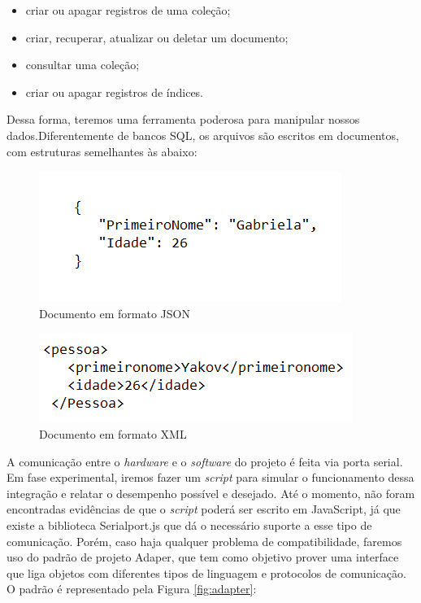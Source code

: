 \begin{itemize}
    \item criar ou apagar registros de uma coleção;
    \item criar, recuperar, atualizar ou deletar um documento;
    \item consultar uma coleção;
    \item criar ou apagar registros de índices. 
\end{itemize}

Dessa forma, teremos uma ferramenta poderosa para manipular nossos dados.Diferentemente de bancos SQL, os arquivos são escritos em documentos, com estruturas semelhantes às abaixo:

\begin{figure}[!h]
	\centering
	\label{json}
		\includegraphics[keepaspectratio=true,scale=0.9]{figuras/json.png}
	\caption{Documento em formato JSON}
	\label{fig:json}
\end{figure}

\begin{figure}[!h]
	\centering
	\label{xml}
		\includegraphics[keepaspectratio=true,scale=0.9]{figuras/xml.png}
	\caption{Documento em formato XML}
	\label{fig:xml}
\end{figure}


A comunicação entre o \textit{hardware} e o \textit{software} do projeto é feita via porta serial. Em fase experimental, iremos fazer um \textit{script} para simular o funcionamento dessa integração e relatar o desempenho possível e desejado. Até o momento, não foram encontradas evidências de que o \textit{script} poderá ser escrito em JavaScript, já que existe a biblioteca Serialport.js \cite{serialport} que dá o necessário suporte a esse tipo de comunicação. Porém, caso haja qualquer problema de compatibilidade, faremos uso do padrão de projeto Adaper, que tem como objetivo prover uma interface que liga objetos com diferentes tipos de linguagem e protocolos de comunicação. O padrão é representado pela Figura \ref{fig:adapter}:

